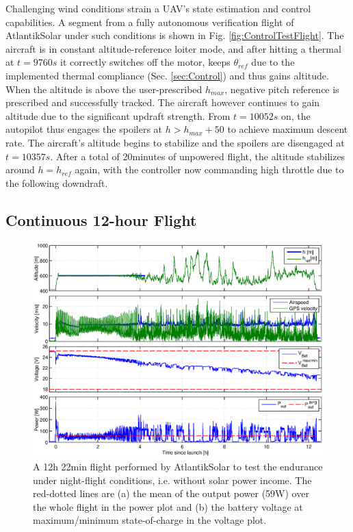 Challenging wind conditions strain a UAV's state estimation and control capabilities. A segment from a fully autonomous verification flight of AtlantikSolar under such conditions is shown in Fig. \ref{fig:ControlTestFlight}. The aircraft is in constant altitude-reference loiter mode, and after hitting a thermal at $t=9760s$ it correctly switches off the motor, keeps $\theta_{ref}$ due to the implemented thermal compliance (Sec. \ref{sec:Control}) and thus gains altitude. When the altitude is above the user-prescribed $h_{max}$, negative pitch reference is prescribed and successfully tracked. The aircraft however continues to gain altitude due to the significant updraft strength. From $t=10052s$ on, the autopilot thus engages the spoilers at $h>h_{max}+50$ to achieve maximum descent rate. The aircraft's altitude begins to stabilize and the spoilers are disengaged at $t=10357s$. After a total of 20minutes of unpowered flight, the altitude stabilizes around $h=h_{ref}$ again, with the controller now commanding high throttle due to the following downdraft. 

\subsection{Continuous 12-hour Flight} \label{sec:12hFlight}
  
\begin{figure}[tb]
    \centering
     \includegraphics[width=\linewidth]{images/12hFlight}
    \caption{A 12h 22min flight performed by AtlantikSolar to test the endurance under night-flight conditions, i.e. without solar power income. The red-dotted lines are (a) the mean of the output power (59W) over the whole flight in the power plot and (b) the battery voltage at maximum/minimum state-of-charge in the voltage plot.} 
    \label{fig:12hFlight}
\end{figure}

